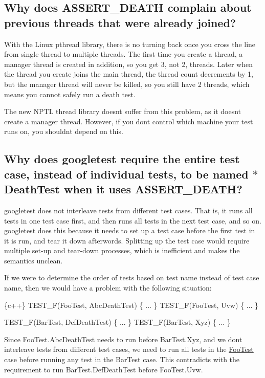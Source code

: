 \subsection*{Why does A\+S\+S\+E\+R\+T\+\_\+\+D\+E\+A\+TH complain about previous threads that were already joined?}

With the Linux pthread library, there is no turning back once you cross the line from single thread to multiple threads. The first time you create a thread, a manager thread is created in addition, so you get 3, not 2, threads. Later when the thread you create joins the main thread, the thread count decrements by 1, but the manager thread will never be killed, so you still have 2 threads, which means you cannot safely run a death test.

The new N\+P\+TL thread library doesn\textquotesingle{}t suffer from this problem, as it doesn\textquotesingle{}t create a manager thread. However, if you don\textquotesingle{}t control which machine your test runs on, you shouldn\textquotesingle{}t depend on this.

\subsection*{Why does googletest require the entire test case, instead of individual tests, to be named $\ast$\+Death\+Test when it uses A\+S\+S\+E\+R\+T\+\_\+\+D\+E\+A\+TH?}

googletest does not interleave tests from different test cases. That is, it runs all tests in one test case first, and then runs all tests in the next test case, and so on. googletest does this because it needs to set up a test case before the first test in it is run, and tear it down afterwords. Splitting up the test case would require multiple set-\/up and tear-\/down processes, which is inefficient and makes the semantics unclean.

If we were to determine the order of tests based on test name instead of test case name, then we would have a problem with the following situation\+:


\begin{DoxyCode}
\{c++\}
TEST\_F(FooTest, AbcDeathTest) \{ ... \}
TEST\_F(FooTest, Uvw) \{ ... \}

TEST\_F(BarTest, DefDeathTest) \{ ... \}
TEST\_F(BarTest, Xyz) \{ ... \}
\end{DoxyCode}


Since {\ttfamily Foo\+Test.\+Abc\+Death\+Test} needs to run before {\ttfamily Bar\+Test.\+Xyz}, and we don\textquotesingle{}t interleave tests from different test cases, we need to run all tests in the {\ttfamily \mbox{\hyperlink{class_foo_test}{Foo\+Test}}} case before running any test in the {\ttfamily Bar\+Test} case. This contradicts with the requirement to run {\ttfamily Bar\+Test.\+Def\+Death\+Test} before {\ttfamily Foo\+Test.\+Uvw}.


